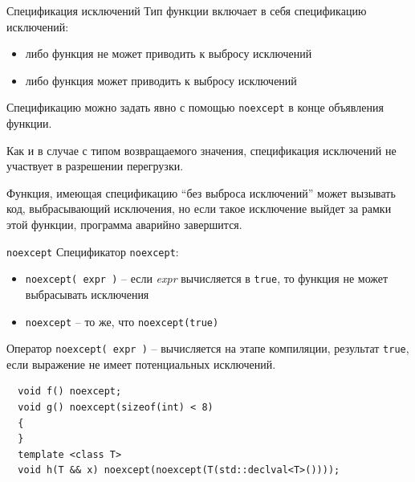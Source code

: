 \documentclass[unknownkeysallowed,xcolor=table]{beamer}
\begin{document}
\begin{frame}{Спецификация исключений}
  Тип функции включает в себя спецификацию исключений:
  \begin{itemize}
    \item либо функция не может приводить к выбросу исключений
    \item либо функция может приводить к выбросу исключений
  \end{itemize}

  \vspace{1em}

  Спецификацию можно задать явно с помощью \lstinline{noexcept} в конце объявления функции.

  \vspace{1em}

  Как и в случае с типом возвращаемого значения, спецификация исключений не участвует в разрешении перегрузки.

  \vspace{1em}

  Функция, имеющая спецификацию ``без выброса исключений'' может вызывать код, выбрасывающий исключения, но если такое исключение выйдет за рамки этой функции, программа
  аварийно завершится.
\end{frame}

\begin{frame}[fragile]{\lstinline{noexcept}}
  Спецификатор \lstinline{noexcept}:
  \begin{itemize}
    \item \lstinline{noexcept( expr )} -- если \emph{expr} вычисляется в \lstinline{true}, то функция не может выбрасывать исключения
    \item \lstinline{noexcept} -- то же, что \lstinline{noexcept(true)}
  \end{itemize}

  \vspace{1em}

  Оператор \lstinline{noexcept( expr )} -- вычисляется на этапе компиляции, результат \lstinline{true}, если выражение не имеет потенциальных исключений.
  \begin{lstlisting}
  void f() noexcept;
  void g() noexcept(sizeof(int) < 8)
  {
  }
  template <class T>
  void h(T && x) noexcept(noexcept(T(std::declval<T>())));
  \end{lstlisting}
\end{frame}
\end{document}
